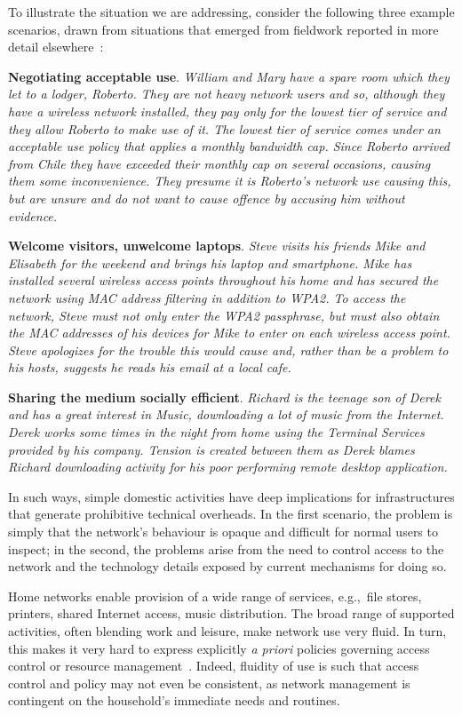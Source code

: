 To illustrate the situation we are addressing, consider the following three
example scenarios, drawn from  situations that emerged from fieldwork 
reported in more detail elsewhere~\cite{wmust2011,Chetty10}: 
 
\textbf{Negotiating acceptable use}.  {\it William and Mary have a spare room
  which they let to a lodger, Roberto.  They are not heavy network users and so,
  although they have a wireless network installed, they pay only for the lowest
  tier of service and they allow Roberto to make use of it.  The lowest tier of
  service comes under an acceptable use policy that applies a monthly bandwidth
  cap.  Since Roberto arrived from Chile they have exceeded their monthly cap on
  several occasions, causing them some inconvenience.  They presume it is
  Roberto's network use causing this, but are unsure and do not want to cause
  offence by accusing him without evidence.}

\textbf{Welcome visitors, unwelcome laptops}.  {\it Steve visits his friends
  Mike and Elisabeth for the weekend and brings his laptop and smartphone.  Mike
  has installed several wireless access points throughout his home and has
  secured the network using MAC address filtering in addition to WPA2.  To
  access the network, Steve must not only enter the WPA2 passphrase, but must
  also obtain the MAC addresses of his devices for Mike to enter on each
  wireless access point.  Steve apologizes for the trouble this would cause and,
  rather than be a problem to his hosts, suggests he reads his email at a local
  cafe.} 

\textbf{Sharing the medium socially efficient}.  {\it Richard is the teenage son
  of Derek and has a great interest in Music, downloading a lot of music from the
  Internet. Derek works some times in the night from home using the Terminal
  Services provided by his company. Tension is created between them as Derek
  blames Richard downloading activity for his poor performing remote desktop
  application. } 

In such ways, simple domestic activities have deep implications for
infrastructures that generate prohibitive technical overheads.  In the first
scenario, the problem is simply that the network's behaviour is opaque and
difficult for normal users to inspect; in the second, the problems arise from
the need to control access to the network and the technology details exposed by
current mechanisms for doing so.  

Home networks enable provision of a wide range of services, e.g.,~file stores,
printers, shared Internet access, music distribution.  The broad range of
supported activities, often blending work and leisure, make network use very
fluid.  In turn, this makes it very hard to express explicitly \emph{a priori}
policies governing access control or resource management~\cite{tolmie07}.
Indeed, fluidity of use is such that access control and policy may not even be
consistent, as network management is contingent on the household's immediate
needs and routines.

